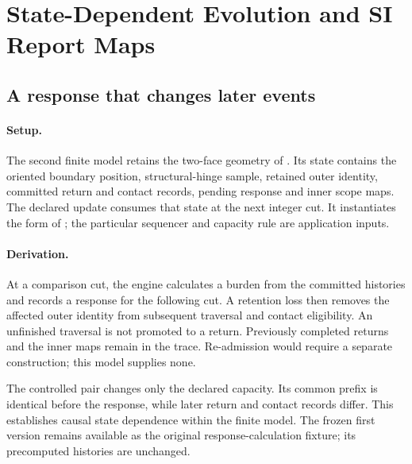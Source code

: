 \section{State-Dependent Evolution and SI Report Maps}
\label{manual2:stateful-si}


\subsection{A response that changes later events}
\paragraph{Setup.}
The second finite model retains the two-face geometry of . Its state contains the oriented boundary position, structural-hinge sample, retained outer identity, committed return and contact records, pending response and inner scope maps. The declared update consumes that state at the next integer cut. It instantiates the form of ; the particular sequencer and capacity rule are application inputs.

\paragraph{Derivation.}
At a comparison cut, the engine calculates a burden from the committed histories and records a response for the following cut. A retention loss then removes the affected outer identity from subsequent traversal and contact eligibility. An unfinished traversal is not promoted to a return. Previously completed returns and the inner maps remain in the trace. Re-admission would require a separate construction; this model supplies none.

The controlled pair changes only the declared capacity. Its common prefix is identical before the response, while later return and contact records differ. This establishes causal state dependence within the finite model. The frozen first version remains available as the original response-calculation fixture; its precomputed histories are unchanged.

